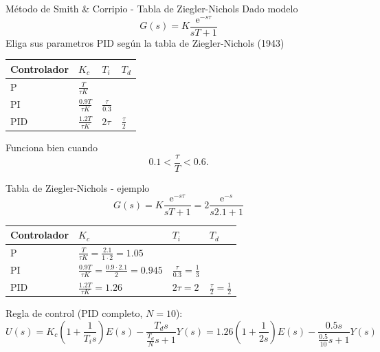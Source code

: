 \documentclass[presentation,aspectratio=1610]{beamer}
\begin{document}
\begin{frame}[label={sec:org5d33a76}]{Método de Smith \& Corripio - Tabla de Ziegler-Nichols}
Dado modelo 
\[ G(s) = K \frac{\mathrm{e}^{-s\tau}}{sT + 1} \]
Eliga sus parametros PID según la tabla de Ziegler-Nichols (1943)
   \begin{center}
   \setlength{\tabcolsep}{20pt}
   \renewcommand{\arraystretch}{1.5}
   \begin{tabular}{llll}
   Controlador & \(K_c\) & \(T_i\) & \(T_d\)\\
  \hline\hline
  P & \(\frac{T}{\tau K}\) &  & \\
  PI & \(\frac{0.9T}{\tau K}\) & \(\frac{\tau}{0.3}\) & \\
  PID & \(\frac{1.2T}{\tau K}\) & \(2\tau\) & \(\frac{\tau}{2}\)\\
  \hline
\end{tabular}
\end{center}

Funciona bien cuando \[0.1 < \frac{\tau}{T} < 0.6.\]
\end{frame}


\begin{frame}[label={sec:org169be4a}]{Tabla de  Ziegler-Nichols - ejemplo}
\[ G(s) = K \frac{\mathrm{e}^{-s\tau}}{sT + 1} = 2 \frac{\mathrm{e}^{-s}}{s2.1 + 1} \]
   \begin{center}
   \setlength{\tabcolsep}{20pt}
   \renewcommand{\arraystretch}{1.5}
   \begin{tabular}{llll}
   Controlador & \(K_c\) & \(T_i\) & \(T_d\)\\
  \hline\hline
  P & \(\frac{T}{\tau K} = \frac{2.1}{1 \cdot 2} = 1.05\) &  & \\
  PI & \(\frac{0.9T}{\tau K} = \frac{0.9\cdot 2.1}{2}= 0.945\) & \(\frac{\tau}{0.3} = \frac{1}{3} \) & \\
  PID & \(\frac{1.2T}{\tau K} = 1.26 \) & \(2\tau=2\) & \(\frac{\tau}{2}=\frac{1}{2}\)\\
  \hline
\end{tabular}
\end{center}
Regla de control (PID completo, \(N=10\)):
\[ U(s) = K_c\left( 1 + \frac{1}{T_i s} \right) E(s) - \frac{T_d s}{\frac{T_d}{N} s + 1}Y(s)
           =  1.26\left( 1 + \frac{1}{2 s} \right) E(s) - \frac{0.5s}{\frac{0.5}{10} s + 1}Y(s)\]
\end{frame}
\end{document}
